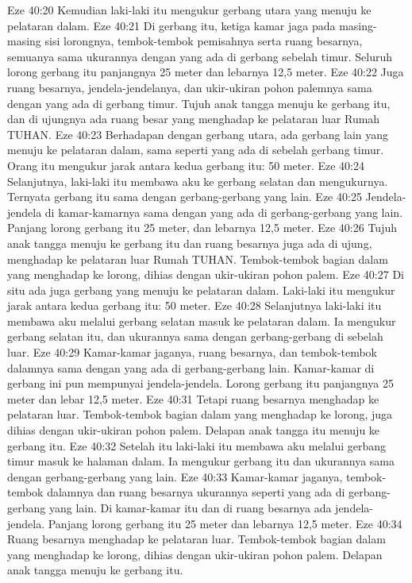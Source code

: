 Eze 40:20  Kemudian laki-laki itu mengukur gerbang utara yang menuju ke pelataran dalam.
Eze 40:21  Di gerbang itu, ketiga kamar jaga pada masing-masing sisi lorongnya, tembok-tembok pemisahnya serta ruang besarnya, semuanya sama ukurannya dengan yang ada di gerbang sebelah timur. Seluruh lorong gerbang itu panjangnya 25 meter dan lebarnya 12,5 meter.
Eze 40:22  Juga ruang besarnya, jendela-jendelanya, dan ukir-ukiran pohon palemnya sama dengan yang ada di gerbang timur. Tujuh anak tangga menuju ke gerbang itu, dan di ujungnya ada ruang besar yang menghadap ke pelataran luar Rumah TUHAN.
Eze 40:23  Berhadapan dengan gerbang utara, ada gerbang lain yang menuju ke pelataran dalam, sama seperti yang ada di sebelah gerbang timur. Orang itu mengukur jarak antara kedua gerbang itu: 50 meter.
Eze 40:24  Selanjutnya, laki-laki itu membawa aku ke gerbang selatan dan mengukurnya. Ternyata gerbang itu sama dengan gerbang-gerbang yang lain.
Eze 40:25  Jendela-jendela di kamar-kamarnya sama dengan yang ada di gerbang-gerbang yang lain. Panjang lorong gerbang itu 25 meter, dan lebarnya 12,5 meter.
Eze 40:26  Tujuh anak tangga menuju ke gerbang itu dan ruang besarnya juga ada di ujung, menghadap ke pelataran luar Rumah TUHAN. Tembok-tembok bagian dalam yang menghadap ke lorong, dihias dengan ukir-ukiran pohon palem.
Eze 40:27  Di situ ada juga gerbang yang menuju ke pelataran dalam. Laki-laki itu mengukur jarak antara kedua gerbang itu: 50 meter.
Eze 40:28  Selanjutnya laki-laki itu membawa aku melalui gerbang selatan masuk ke pelataran dalam. Ia mengukur gerbang selatan itu, dan ukurannya sama dengan gerbang-gerbang di sebelah luar.
Eze 40:29  Kamar-kamar jaganya, ruang besarnya, dan tembok-tembok dalamnya sama dengan yang ada di gerbang-gerbang lain. Kamar-kamar di gerbang ini pun mempunyai jendela-jendela. Lorong gerbang itu panjangnya 25 meter dan lebar 12,5 meter.
Eze 40:31  Tetapi ruang besarnya menghadap ke pelataran luar. Tembok-tembok bagian dalam yang menghadap ke lorong, juga dihias dengan ukir-ukiran pohon palem. Delapan anak tangga itu menuju ke gerbang itu.
Eze 40:32  Setelah itu laki-laki itu membawa aku melalui gerbang timur masuk ke halaman dalam. Ia mengukur gerbang itu dan ukurannya sama dengan gerbang-gerbang yang lain.
Eze 40:33  Kamar-kamar jaganya, tembok-tembok dalamnya dan ruang besarnya ukurannya seperti yang ada di gerbang-gerbang yang lain. Di kamar-kamar itu dan di ruang besarnya ada jendela-jendela. Panjang lorong gerbang itu 25 meter dan lebarnya 12,5 meter.
Eze 40:34  Ruang besarnya menghadap ke pelataran luar. Tembok-tembok bagian dalam yang menghadap ke lorong, dihias dengan ukir-ukiran pohon palem. Delapan anak tangga menuju ke gerbang itu.
